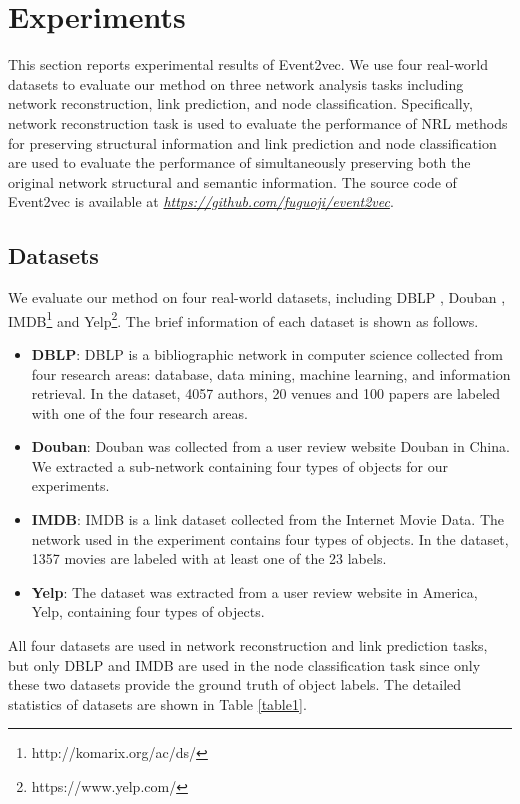 \section{Experiments}
This section reports experimental results of Event2vec. We use four real-world datasets to evaluate our method on three network analysis tasks including network reconstruction, link prediction, and node classification. Specifically, network reconstruction task is used to evaluate the performance of NRL methods for preserving structural information and link prediction and node classification are used to evaluate the performance of simultaneously preserving both the original network structural and semantic information. The source code of Event2vec is available at {\itshape \url{https://github.com/fuguoji/event2vec}}.

\subsection{Datasets}
We evaluate our method on four real-world datasets, including DBLP \cite{sun2011pathsim}, Douban \cite{zheng2017recommendation}, IMDB\footnote{http://komarix.org/ac/ds/} and Yelp\footnote{https://www.yelp.com/}. The brief information of each dataset is shown as follows.

\begin{itemize}
	\item \textbf{DBLP}: DBLP is a bibliographic network in computer science collected from four research areas: database, data mining, machine learning, and information retrieval. In the dataset, 4057 authors, 20 venues and 100 papers are labeled with one of the four research areas.
	\item \textbf{Douban}: Douban was collected from a user review website Douban in China. We extracted a sub-network containing four types of objects for our experiments.
	\item \textbf{IMDB}: IMDB is a link dataset collected from the Internet Movie Data. The network used in the experiment contains four types of objects. In the dataset, 1357 movies are labeled with at least one of the 23 labels.
	\item \textbf{Yelp}: The dataset was extracted from a user review website in America, Yelp, containing four types of objects.
\end{itemize}

All four datasets are used in network reconstruction and link prediction tasks, but only DBLP and IMDB are used in the node classification task since only these two datasets provide the ground truth of object labels. The detailed statistics of datasets are shown in Table \ref{table1}.

